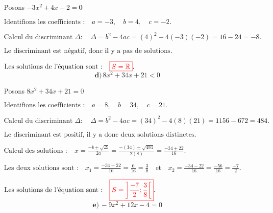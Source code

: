 \documentclass[12pt,a4paper]{article}
\begin{document}
Posons \( -3x^2 + 4x - 2 = 0 \)

\(
\text{Identifions les coefficients :} \quad a = -3, \quad b = 4, \quad c = -2.
\)

\(
\text{Calcul du discriminant } \Delta : \quad
\Delta = b^2 - 4ac = (4)^2 - 4(-3)(-2) = 16 - 24  = -8.
\)

\(
\text{Le discriminant est négatif, donc il y a pas de solutions.}
\)


\(
\text{Les solutions de l'équation sont :} \quad
\textcolor{red}{\boxed{S=\mathbb{R} }}.
\)
\\
\[
\textbf{d)} \, 8x^2 + 34x + 21 < 0
\]

Posons \( 8x^2 + 34x + 21 = 0 \)

\(
\text{Identifions les coefficients :} \quad a = 8, \quad b = 34, \quad c = 21.
\)

\(
\text{Calcul du discriminant } \Delta : \quad
\Delta = b^2 - 4ac = (34)^2 - 4(8)(21) = 1156 - 672  = 484.
\)

\(
\text{Le discriminant est positif, il y a donc deux solutions distinctes.}
\)

\(
\text{Calcul des solutions :} \quad
x = \frac{-b \pm \sqrt{\Delta}}{2a} = \frac{-(34) \pm \sqrt{484}}{2(8)} = \frac{-34 \pm 22}{16}.
\)

\(
\text{Les deux solutions sont :} \quad
x_1 = \frac{-34 + 22}{16} = \frac{6}{16} = \frac{3}{8} \quad \text{et} \quad x_2 = \frac{-34 - 22}{16} = \frac{-56}{16} = \frac{-7}{2}.
\)


\(
\text{Les solutions de l'équation sont :} \quad
\textcolor{red}{\boxed{S=\left]\frac{-7}{2};\frac{3}{8} \right[ }}.
\)
\\

\[ \textbf{e)} \, -9x^2 + 12x - 4 = 0 \]
\end{document}
